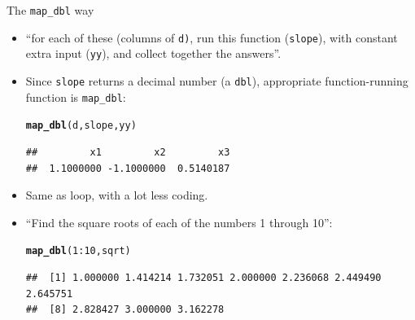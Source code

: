 \documentclass[unknownkeysallowed]{beamer}\usepackage[]{graphicx}\usepackage[]{color}
\makeatletter
\newcommand{\hlnum}[1]{\textcolor[rgb]{0.686,0.059,0.569}{#1}}%
\newcommand{\hlopt}[1]{\textcolor[rgb]{0,0,0}{#1}}%
\newcommand{\hlstd}[1]{\textcolor[rgb]{0.345,0.345,0.345}{#1}}%
\newcommand{\hlkwd}[1]{\textcolor[rgb]{0.737,0.353,0.396}{\textbf{#1}}}%
\newenvironment{kframe}{%
 \def\at@end@of@kframe{}%
 \ifinner\ifhmode%
  \def\at@end@of@kframe{\end{minipage}}%
  \begin{minipage}{\columnwidth}%
 \fi\fi%
 \def\FrameCommand##1{\hskip\@totalleftmargin \hskip-\fboxsep
 \colorbox{shadecolor}{##1}\hskip-\fboxsep
     \hskip-\linewidth \hskip-\@totalleftmargin \hskip\columnwidth}%
 \MakeFramed {\advance\hsize-\width
   \@totalleftmargin\z@ \linewidth\hsize
   \@setminipage}}%
 {\par\unskip\endMakeFramed%
 \at@end@of@kframe}
\newenvironment{knitrout}{}{} %
\makeatother
\begin{document}
\begin{frame}[fragile]{The \texttt{map\_dbl} way}
  
  \begin{itemize}
  \item ``for each of these (columns of \texttt{d)}, run this function
    (\texttt{slope}), with constant extra input (\texttt{yy}), and
    collect together the answers''.
  \item Since \texttt{slope} returns a decimal number (a
    \texttt{dbl}), appropriate function-running function is \texttt{map\_dbl}:
    
\begin{knitrout}
\color{fgcolor}\begin{kframe}
\begin{alltt}
\hlkwd{map_dbl}\hlstd{(d,slope,yy)}
\end{alltt}
\begin{verbatim}
##         x1         x2         x3 
##  1.1000000 -1.1000000  0.5140187
\end{verbatim}
\end{kframe}
\end{knitrout}
\item Same as loop, with a lot less coding.
\item ``Find the square roots of each of the numbers 1 through 10'':
  
\begin{knitrout}\footnotesize
{}\color{fgcolor}\begin{kframe}
\begin{alltt}
\hlkwd{map_dbl}\hlstd{(}\hlnum{1}\hlopt{:}\hlnum{10}\hlstd{,sqrt)}
\end{alltt}
\begin{verbatim}
##  [1] 1.000000 1.414214 1.732051 2.000000 2.236068 2.449490 2.645751
##  [8] 2.828427 3.000000 3.162278
\end{verbatim}
\end{kframe}
\end{knitrout}
  \end{itemize}
  
\end{frame}
\end{document}
